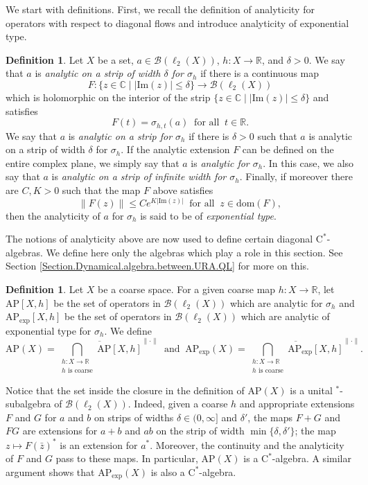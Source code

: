 \documentclass[11pt]{amsart}
\newcommand{\R}{\mathbb{R}}
\newcommand{\C}{\mathbb{C}}
\newcommand{\cB}{\mathcal{B}}
\newcommand{\cstar}{$\mathrm{C}^*$}
\newcommand{\AP}{\mathrm{AP}}
\numberwithin{equation}{section}
\theoremstyle{definition}
\newtheorem{definition}[theorem]{Definition}
\theoremstyle{remark}
\begin{document}
We start with definitions. First, we recall   the definition of analyticity for operators with respect to diagonal flows and introduce analyticity of exponential type.

\begin{definition}\label{Def.BandAnalytic.functions}
Let $X$ be a set,    $a\in\cB(\ell_2(X))$,  $h\colon X\to \R$, and $\delta>0$. We say that $a$ is \emph{analytic on a strip of width $\delta$ for $\sigma_h$} if   there is a continuous map \[F\colon\{z\in\C\mid |\mathrm{Im}(z)|\leq\delta\}\to\cB(\ell_2(X))\] which is holomorphic on the interior of the strip  $\{z\in\C\mid |\mathrm{Im}(z)|\leq\delta\}$ and satisfies \[F(t)=\sigma_{h,t}(a)\ \text{ for all }\ t\in\R.\]
We say that  $a$ is \emph{analytic on a strip   for $\sigma_h$} if there is $\delta>0$ such that $a$ is analytic on a strip of width $\delta$ for $\sigma_h$. If the analytic extension  $F$ can be defined on the entire complex plane, we simply say that $a$ is \emph{analytic for $\sigma_h$}. In this case, we also say that $a$ is \emph{analytic on a strip of infinite width for $\sigma_h$}. Finally, if moreover there are $C,K>0$ such that the map $F$ above satisfies
\[\|F(z)\|\leq Ce^{K|\mathrm{Im}(z)|}\ \text{ for all }\ z\in \mathrm{dom}(F),\]
then the analyticity of $a$ for $\sigma_h$ is said to be of \emph{exponential type}.
\end{definition}

The notions of analyticity above are now used to define certain diagonal \cstar-algebras. We define here only the algebras which play a role in this section. See Section  \ref{Section.Dynamical.algebra.between.URA.QL} for more on this.

\begin{definition}\label{Def.AP.algebra.defi}
Let $X$ be a coarse space.  For a given coarse map $h\colon X\to \R$, let  $\AP[X,h]$ be the set of operators in $ \cB(\ell_2(X))$ which are analytic   for $\sigma_h$ and   $\AP_{\exp}[X,h]$ be the set of operators in $ \cB(\ell_2(X))$ which are analytic of exponential type   for $\sigma_h$. We define
    \[\AP(X)=\overline{\bigcap_{\substack{h\colon X\to \R\\ h\text{ is coarse}}} \AP[X,h]}^{\|\cdot\|}\ \text{ and }\ \AP_{\exp}(X)=\overline{\bigcap_{\substack{h\colon X\to \R\\ h\text{ is coarse}}} \AP_{\exp}[X,h]}^{\|\cdot\|}.\]
\end{definition}


Notice   that the set inside the closure in the definition of $\AP(X)$ is a  unital $^*$-subalgebra of $\cB(\ell_2(X))$. Indeed, given a coarse $h$ and appropriate extensions $F$ and $G$ for $a$ and $b$ on strips of widths $\delta\in (0,\infty]$ and $\delta'$, the maps $F+G$ and $FG$ are extensions for $a+b$ and $ab$ on the strip  of width $\min\{\delta,\delta'\}$; the map $z\mapsto F(\bar z)^*$ is an extension for $a^*$. Moreover, the continuity and the analyticity of $F$ and $G$ pass to these maps.   In particular,  $\AP(X)$ is a \cstar-algebra. A similar argument shows that $\mathrm{AP}_{\exp}(X)$ is also a \cstar-algebra.
\end{document}
